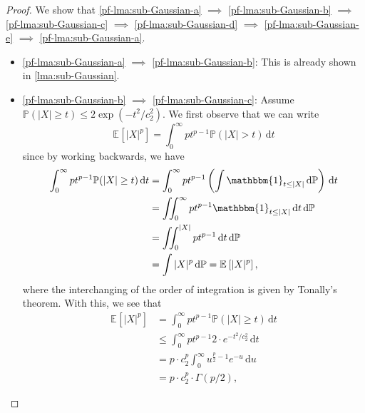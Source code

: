 \begin{proof}
	We show that \autoref{pf-lma:sub-Gaussian-a} \(\implies \) \autoref{pf-lma:sub-Gaussian-b} \(\implies \) \autoref{pf-lma:sub-Gaussian-c} \(\implies \) \autoref{pf-lma:sub-Gaussian-d} \(\implies \) \autoref{pf-lma:sub-Gaussian-e} \(\implies \) \autoref{pf-lma:sub-Gaussian-a}.
	\begin{itemize}
		\item \autoref{pf-lma:sub-Gaussian-a} \(\implies \) \autoref{pf-lma:sub-Gaussian-b}: This is already shown in \autoref{lma:sub-Gaussian}.
		\item \autoref{pf-lma:sub-Gaussian-b} \(\implies \) \autoref{pf-lma:sub-Gaussian-c}: Assume \(\mathbb{P} (\vert X \vert \geq t) \leq 2 \exp (-t^2 / c_2^2)\). We first observe that we can write
		      \[
			      \mathbb{E}_{}\left[\vert X \vert ^p \right] = \int_{0}^{\infty} p t^{p-1} \mathbb{P} (\vert X \vert > t) \,\mathrm{d}t
		      \]
		      since by working backwards, we have
		      \[
			      \begin{split}
				      \int_{0}^{\infty} p t^{p-1} \mathbb{P} (\vert X \vert \geq t) \,\mathrm{d}t
				       & = \int_{0}^{\infty} p t^{p-1} \left( \int \mathbbm{1}_{t \leq \vert X \vert } \,\mathrm{d} \mathbb{P} \right)  \,\mathrm{d}t \\
				       & = \iint_{0}^{\infty} p t^{p-1} \mathbbm{1}_{t \leq \vert X \vert } \,\mathrm{d}t \,\mathrm{d} \mathbb{P}                     \\
				       & = \iint_{0}^{\vert X \vert } p t^{p-1} \,\mathrm{d}t \,\mathrm{d} \mathbb{P}                                                 \\
				       & = \int \vert X \vert ^p \,\mathrm{d} \mathbb{P}
				      = \mathbb{E}_{}\left[\vert X \vert ^p \right],
			      \end{split}
		      \]
		      where the interchanging of the order of integration is given by Tonally's theorem. With this, we see that
		      \begin{align*}
			      \mathbb{E}_{}\left[\vert X \vert ^p \right]
			       & = \int_{0}^{\infty} p t^{p-1} \mathbb{P} (\vert X \vert \geq t) \,\mathrm{d}t                        \\
			       & \leq \int_{0}^{\infty} p t^{p-1} 2\cdot e^{-t^2 / c^2_2} \,\mathrm{d}t                               \\
			       & = p\cdot c_2^p \int_{0}^{\infty} u^{\frac{p}{2} - 1} e^{-u} \,\mathrm{d}u \tag*{\(u = t^2 / c_2^2\)} \\
			       & = p\cdot c^p_2 \cdot \Gamma (p / 2),

\end{align*}
\end{itemize}
\end{proof}
